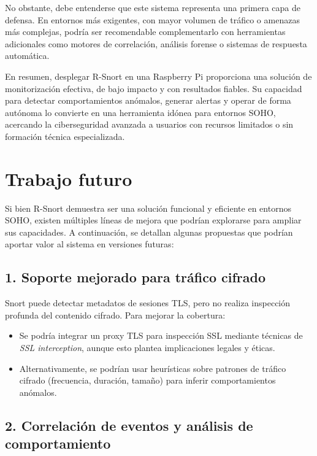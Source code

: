\documentclass[11pt,a4paper,twoside]{report}
\begin{document}
No obstante, debe entenderse que este sistema representa una primera capa de defensa. En entornos más exigentes, con mayor volumen de tráfico o amenazas más complejas, podría ser recomendable complementarlo con herramientas adicionales como motores de correlación, análisis forense o sistemas de respuesta automática.\newline

En resumen, desplegar R-Snort en una Raspberry Pi proporciona una solución de monitorización efectiva, de bajo impacto y con resultados fiables. Su capacidad para detectar comportamientos anómalos, generar alertas y operar de forma autónoma lo convierte en una herramienta idónea para entornos SOHO, acercando la ciberseguridad avanzada a usuarios con recursos limitados o sin formación técnica especializada.


\chapter*{Trabajo futuro}

Si bien R-Snort demuestra ser una solución funcional y eficiente en entornos SOHO, existen múltiples líneas de mejora que podrían explorarse para ampliar sus capacidades. A continuación, se detallan algunas propuestas que podrían aportar valor al sistema en versiones futuras:

\section*{1. Soporte mejorado para tráfico cifrado}

Snort puede detectar metadatos de sesiones TLS, pero no realiza inspección profunda del contenido cifrado. Para mejorar la cobertura:

\begin{itemize}
	\item Se podría integrar un proxy TLS para inspección SSL mediante técnicas de \textit{SSL interception}, aunque esto plantea implicaciones legales y éticas.
	\item Alternativamente, se podrían usar heurísticas sobre patrones de tráfico cifrado (frecuencia, duración, tamaño) para inferir comportamientos anómalos.
\end{itemize}

\section*{2. Correlación de eventos y análisis de comportamiento}
\end{document}
